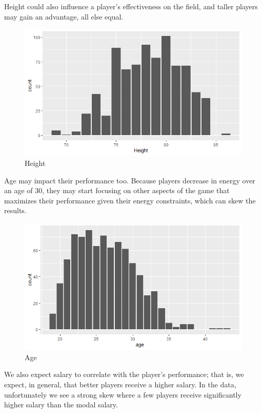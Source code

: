 \documentclass[12pt]{article}
\begin{document}
	Height could also influence a player's effectiveness on the field, and taller players may gain an advantage, all else equal.
	
	\begin{figure}[H]
		\centering
		\includegraphics[width=\textwidth]{height.png}
		\caption{Height}
		\label{fig:Height}
	\end{figure}
	
	Age may impact their performance too. Because players decrease in energy over an age of 30, they may start focusing on other aspects of the game that maximizes their performance given their energy constraints, which can skew the results.
	
	\begin{figure}[H]
		\centering
		\includegraphics[width=\textwidth]{age.png}
		\caption{Age}
		\label{fig:Age}
	\end{figure}
	
	We also expect salary to correlate with the player's performance; that is, we expect, in general, that better players receive a higher salary. In the data, unfortunately we see a strong skew where a few players receive significantly higher salary than the modal salary.
	
\end{document}
